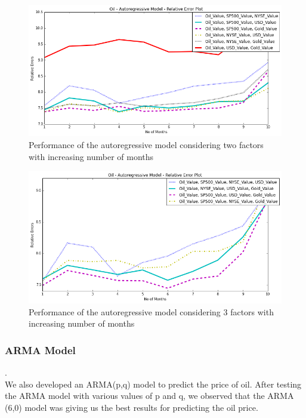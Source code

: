 \documentclass[runningheads]{llncs}
\begin{document}
\begin{figure}
\centering
\includegraphics[width=\textwidth]{oil_autoregressive_2factors_10.png}
\caption{Performance of the autoregressive model considering two factors with increasing number of months}
\label{fig:oil_autoregressive_2factors_10.png}
\end{figure}

\begin{figure}
\centering
\includegraphics[width=\textwidth]{oil_autoregressive_3factors_10.png}
\caption{Performance of the autoregressive model considering 3 factors with increasing number of months}
\label{fig:oil_autoregressive_3factors_10.png}
\end{figure}

\newpage
\subsubsection {ARMA Model}.\\

\noindent We also developed an ARMA(p,q) model to predict the price of oil. After testing the ARMA model with various values of p and q, we observed that the ARMA (6,0) model was giving us the best results for predicting the oil price.  \\
\end{document}

